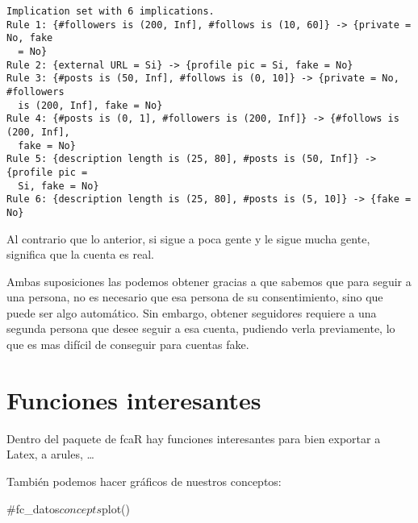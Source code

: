 \documentclass[
  letterpaper,
  DIV=11,
  numbers=noendperiod]{scrreprt}
\newenvironment{Shaded}{\begin{snugshade}}{\end{snugshade}}
\newcommand{\CommentTok}[1]{\textcolor[rgb]{0.37,0.37,0.37}{#1}}
\newcommand{\FunctionTok}[1]{\textcolor[rgb]{0.28,0.35,0.67}{#1}}
\newcommand{\NormalTok}[1]{\textcolor[rgb]{0.00,0.23,0.31}{#1}}
\newcommand{\OtherTok}[1]{\textcolor[rgb]{0.00,0.23,0.31}{#1}}
\newcommand{\SpecialCharTok}[1]{\textcolor[rgb]{0.37,0.37,0.37}{#1}}
\begin{document}
\begin{verbatim}
Implication set with 6 implications.
Rule 1: {#followers is (200, Inf], #follows is (10, 60]} -> {private = No, fake
  = No}
Rule 2: {external URL = Si} -> {profile pic = Si, fake = No}
Rule 3: {#posts is (50, Inf], #follows is (0, 10]} -> {private = No, #followers
  is (200, Inf], fake = No}
Rule 4: {#posts is (0, 1], #followers is (200, Inf]} -> {#follows is (200, Inf],
  fake = No}
Rule 5: {description length is (25, 80], #posts is (50, Inf]} -> {profile pic =
  Si, fake = No}
Rule 6: {description length is (25, 80], #posts is (5, 10]} -> {fake = No}
\end{verbatim}

Al contrario que lo anterior, si sigue a poca gente y le sigue mucha
gente, significa que la cuenta es real.

Ambas suposiciones las podemos obtener gracias a que sabemos que para
seguir a una persona, no es necesario que esa persona de su
consentimiento, sino que puede ser algo automático. Sin embargo, obtener
seguidores requiere a una segunda persona que desee seguir a esa cuenta,
pudiendo verla previamente, lo que es mas difícil de conseguir para
cuentas fake.

\section{Funciones interesantes}\label{funciones-interesantes-1}

Dentro del paquete de fcaR hay funciones interesantes para bien exportar
a Latex, a arules, \ldots{}

\begin{Shaded}
\end{Shaded}

También podemos hacer gráficos de nuestros conceptos:

\begin{Shaded}
\begin{Highlighting}[]
\CommentTok{\#fc\_datos$concepts$plot()}
\end{Highlighting}
\end{Shaded}

\end{document}
